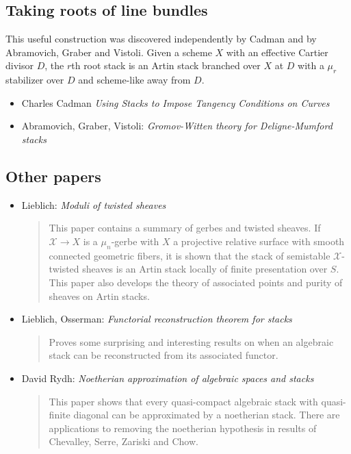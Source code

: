 \subsection{Taking roots of line bundles}
\label{subsection-root-stacks}

\noindent
This useful construction was discovered independently by Cadman and by
Abramovich, Graber and Vistoli. Given a scheme $X$ with an effective Cartier
divisor $D$, the $r$th root stack is an Artin stack branched over $X$ at $D$
with a $\mu_r$ stabilizer over $D$ and scheme-like away from $D$.
\begin{itemize}
\item Charles Cadman
\emph{Using Stacks to Impose Tangency Conditions on Curves}
\cite{cadman}
\item Abramovich, Graber, Vistoli: \emph{Gromov-Witten theory for
Deligne-Mumford stacks} \cite{agv}
\end{itemize}

\subsection{Other papers}
\label{subsection-other}

\begin{itemize}
\item Lieblich: \emph{Moduli of twisted sheaves} \cite{lieblich_twisted}
\begin{quote}
This paper contains a summary of gerbes and twisted sheaves.
If $\mathcal{X} \rightarrow X$ is a $\mu_n$-gerbe with $X$ a projective
relative surface with smooth connected geometric fibers, it is shown that
the stack of semistable $\mathcal{X}$-twisted sheaves is an Artin stack
locally of finite presentation over $S$. This paper also develops the
theory of associated points and purity of sheaves on Artin stacks.
\end{quote}
\item Lieblich, Osserman:
\emph{Functorial reconstruction theorem for stacks}
\cite{lieblich-osserman}
\begin{quote}
Proves some surprising and interesting results on
when an algebraic stack can be reconstructed from its associated functor.
\end{quote}
\item David Rydh:
\emph{Noetherian approximation of algebraic spaces and stacks}
\cite{rydh_approx}
\begin{quote}
This paper shows that every quasi-compact algebraic stack
with quasi-finite diagonal can be approximated by a noetherian stack.
There are applications to removing the noetherian hypothesis in results
of Chevalley, Serre, Zariski and Chow.
\end{quote}
\end{itemize}



